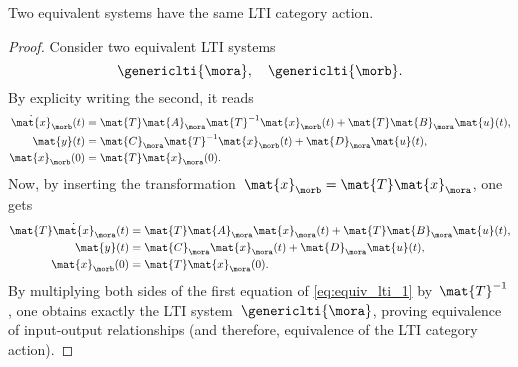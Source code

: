 \begin{lemma}
    Two equivalent systems have the same LTI category action.
\end{lemma}
\begin{proof}
    Consider two equivalent LTI systems
    \begin{equation*}
        \genericlti{\mora},\quad \genericlti{\morb}.
    \end{equation*}
    By explicity writing the second, it reads
    \begin{equation*}
        \begin{aligned}
            \dot{\mat{x}}_\morb(t) & =\mat{T}\mat{A}_{\mora}\mat{T}^{-1}\mat{x}_\morb(t)+\mat{T}\mat{B}_{\mora}\mat{u}(t), \\
            \mat{y}(t)             & =\mat{C}_{\mora}\mat{T}^{-1}\mat{x}_\morb(t)+\mat{D}_{\mora}\mat{u}(t), \\
            \mat{x}_\morb(0)       & =\mat{T}\mat{x}_{\mora}(0).
        \end{aligned}
    \end{equation*}
    Now, by inserting the transformation~$\mat{x}_\morb=\mat{T}\mat{x}_\mora$, one gets
    \begin{equation}
        \label{eq:equiv_lti_1}
        \begin{aligned}
            \mat{T}\dot{\mat{x}}_\mora(t) & =\mat{T}\mat{A}_{\mora}\mat{x}_\mora(t)+\mat{T}\mat{B}_{\mora}\mat{u}(t), \\
            \mat{y}(t)                    & =\mat{C}_{\mora}\mat{x}_\mora(t)+\mat{D}_{\mora}\mat{u}(t), \\
            \mat{x}_\morb(0)              & =\mat{T}\mat{x}_{\mora}(0).
        \end{aligned}
    \end{equation}
    By multiplying both sides of the first equation of \cref{eq:equiv_lti_1} by~$\mat{T}^{-1}$, one obtains exactly the LTI system~$\genericlti{\mora}$, proving equivalence of input-output relationships (and therefore, equivalence of the LTI category action).
\end{proof}

